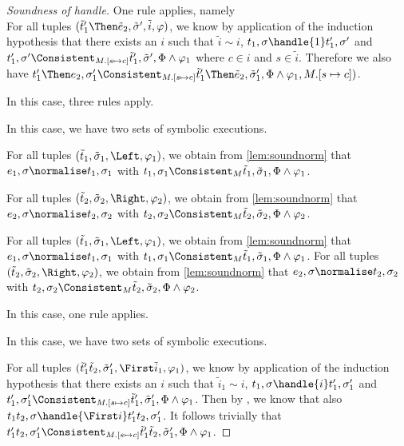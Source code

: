 \begin{proof}[Soundness of handle]
{One rule applies, namely \\
For all tuples $(\tilde{t}_1'\Then\tilde{e}_2,\tilde{\sigma}',\tilde{i},\phi)$, we know by application of the induction hypothesis that
there exists an $i$ such that $\tilde{i}\sim i$, $t_1,\sigma\handle{1}t_1',\sigma'$ and
$t_1',\sigma'\Consistent_{M.[s\mapsto c]}\tilde{t}_1',\tilde{\sigma}',\Phi\land\phi_1$ where $c\in i$ and $s\in \tilde{i}$.
Therefore we also have $t_1'\Then e_2,\sigma_1'\Consistent_{M.[s\mapsto c]}\tilde{t}_1'\Then \tilde{e}_2,\tilde{\sigma}_1',\Phi\land\phi_1,M.[s\mapsto c])$.
}

 {
In this case, three rules apply.\\
   {
   In this case, we have two sets of symbolic executions.

   For all tuples $(\tilde{t}_1,\tilde{\sigma}_1,\Left,\phi_1)$,
   we obtain from \cref{lem:soundnorm} that $e_1,\sigma\normalise t_1,\sigma_1$ with
   $t_1,\sigma_1\Consistent_M\tilde{t}_1,\tilde{\sigma}_1,\Phi\land\phi_1$.

   For all tuples $(\tilde{t}_2,\tilde{\sigma}_2,\Right,\phi_2)$,
   we obtain from \cref{lem:soundnorm} that $e_2,\sigma\normalise t_2,\sigma_2$ with
   $t_2,\sigma_2\Consistent_M\tilde{t}_2,\tilde{\sigma}_2,\Phi\land\phi_2$.
   }
%
  {
  For all tuples $(\tilde{t}_1,\tilde{\sigma}_1,\Left,\phi_1)$,
  we obtain from \cref{lem:soundnorm} that $e_1,\sigma\normalise t_1,\sigma_1$ with
  $t_1,\sigma_1\Consistent_M\tilde{t}_1,\tilde{\sigma}_1,\Phi\land\phi_1$.
%
}
  {
  For all tuples $(\tilde{t}_2,\tilde{\sigma}_2,\Right,\phi_2)$,
  we obtain from \cref{lem:soundnorm} that $e_2,\sigma\normalise t_2,\sigma_2$ with
  $t_2,\sigma_2\Consistent_M\tilde{t}_2,\tilde{\sigma}_2,\Phi\land\phi_2$.
  }
 }
%
{
In this case, one rule applies. 

In this case, we have two sets of symbolic executions.

  For all tuples $(\tilde{t}_1'\And\tilde{t}_2,\tilde{\sigma}_1',\First \tilde{i}_1,\phi_1)$,
  we know by application of the induction hypothesis that there exists an $i$ such that
  $\tilde{i}_1\sim i$, $t_1,\sigma\handle{i}t_1',\sigma_1'$ and
  $t_1',\sigma_1'\Consistent_{M.[s\mapsto c]}\tilde{t}_1',\tilde{\sigma}_1',\Phi\land\phi_1$.
  Then by , we know that also $t_1\And t_2,\sigma\handle{\First i}t_1'\And t_2,\sigma_1'$.
  It follows trivially that $t_1'\And t_2,\sigma_1'\Consistent_{M.[s\mapsto c]}\tilde{t}_1'\And \tilde{t}_2,\tilde{\sigma}_1',\Phi\land\phi_1$.

}
\end{proof}
